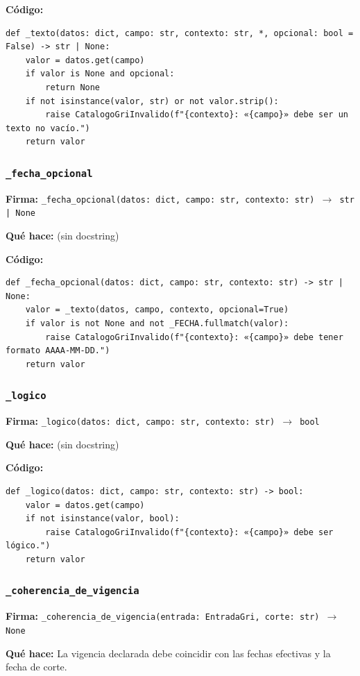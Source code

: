 \documentclass[11pt,a4paper]{article}
\begin{document}
\textbf{Código:}
\begin{lstlisting}
def _texto(datos: dict, campo: str, contexto: str, *, opcional: bool = False) -> str | None:
    valor = datos.get(campo)
    if valor is None and opcional:
        return None
    if not isinstance(valor, str) or not valor.strip():
        raise CatalogoGriInvalido(f"{contexto}: «{campo}» debe ser un texto no vacío.")
    return valor
\end{lstlisting}

\subsubsection*{\texttt{\_fecha\_opcional}}
\textbf{Firma:} \texttt{\_fecha\_opcional(datos: dict, campo: str, contexto: str) $\rightarrow$ str | None}

\textbf{Qué hace:} (sin docstring)

\textbf{Código:}
\begin{lstlisting}
def _fecha_opcional(datos: dict, campo: str, contexto: str) -> str | None:
    valor = _texto(datos, campo, contexto, opcional=True)
    if valor is not None and not _FECHA.fullmatch(valor):
        raise CatalogoGriInvalido(f"{contexto}: «{campo}» debe tener formato AAAA-MM-DD.")
    return valor
\end{lstlisting}

\subsubsection*{\texttt{\_logico}}
\textbf{Firma:} \texttt{\_logico(datos: dict, campo: str, contexto: str) $\rightarrow$ bool}

\textbf{Qué hace:} (sin docstring)

\textbf{Código:}
\begin{lstlisting}
def _logico(datos: dict, campo: str, contexto: str) -> bool:
    valor = datos.get(campo)
    if not isinstance(valor, bool):
        raise CatalogoGriInvalido(f"{contexto}: «{campo}» debe ser lógico.")
    return valor
\end{lstlisting}

\subsubsection*{\texttt{\_coherencia\_de\_vigencia}}
\textbf{Firma:} \texttt{\_coherencia\_de\_vigencia(entrada: EntradaGri, corte: str) $\rightarrow$ None}

\textbf{Qué hace:} La vigencia declarada debe coincidir con las fechas efectivas y la fecha de corte.
\end{document}
